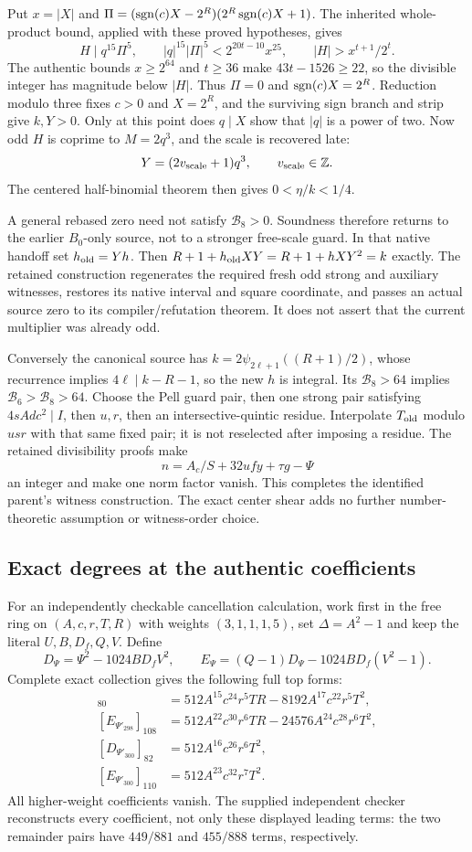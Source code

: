 Put $x=|X|$ and
$\Pi=(\operatorname{sgn}(c)X-2^R)(2^R\operatorname{sgn}(c)X+1)$.
The inherited whole-product bound, applied with these proved hypotheses,
gives
\[
 H\mid q^{15}\Pi^5,\qquad
 |q|^{15}|\Pi|^5<2^{20t-10}x^{25},
 \qquad |H|>x^{t+1}/2^t.
\]
The authentic bounds $x\ge2^{64}$ and $t\ge36$ make
$43t-1526\ge22$, so the divisible integer has magnitude below $|H|$.
Thus $\Pi=0$ and $\operatorname{sgn}(c)X=2^R$. Reduction modulo three fixes
$c>0$ and $X=2^R$, and the surviving sign branch and strip give $k,Y>0$.
Only at this point does $q\mid X$ show that $|q|$ is a power of two.
Now odd $H$ is coprime to $M=2q^3$, and the scale is recovered late:
\[
 Y=(2v_{\rm scale}+1)q^3,\qquad v_{\rm scale}\in\mathbb Z.
\]
The centered half-binomial theorem then gives $0<\eta/k<1/4$.

A general rebased zero need not satisfy $\mathcal B_8>0$.
Soundness therefore returns to the earlier $B_0$-only source, not to a
stronger free-scale guard. In that native handoff set
$h_{\rm old}=Yh$. Then
$R+1+h_{\rm old}XY=R+1+hXY^2=k$ exactly.
The retained construction regenerates the required fresh odd strong and
auxiliary witnesses, restores its native interval and square coordinate,
and passes an actual source zero to its compiler/refutation theorem.
It does not assert that the current multiplier was already odd.

Conversely the canonical source has
$k=2\psi_{2\ell+1}((R+1)/2)$, whose recurrence implies
$4\ell\mid k-R-1$, so the new $h$ is integral.
Its $\mathcal B_8>64$ implies $\mathcal B_6>\mathcal B_8>64$.
Choose the Pell guard pair, then one strong pair satisfying
$4sAdc^2\mid I$, then $u,r$, then an intersective-quintic residue.
Interpolate $T_{\rm old}$ modulo $usr$ with that same fixed pair;
it is not reselected after imposing a residue. The retained divisibility
proofs make
\[
 n=A_c/S+32ufy+\tau g-\Psi
\]
an integer and make one norm factor vanish. This completes the identified
parent's witness construction. The exact center shear adds no further
number-theoretic assumption or witness-order choice.

\subsection{Exact degrees at the authentic coefficients}
For an independently checkable cancellation calculation, work first in the
free ring on $(A,c,r,T,R)$ with weights $(3,1,1,1,5)$, set
$\Delta=A^2-1$ and keep the literal $U,B,D_f,Q,V$. Define
\[
 D_\Psi=\Psi^2-1024BD_fV^2,
 \qquad E_\Psi=(Q-1)D_\Psi-1024BD_f(V^2-1).
\]
Complete exact collection gives the following full top forms:
\begin{align*}
 [D_{\Psi'_{298}}]_{80}
   &=512A^{15}c^{24}r^5TR-8192A^{17}c^{22}r^5T^2,\\
 [E_{\Psi'_{298}}]_{108}
   &=512A^{22}c^{30}r^6TR-24576A^{24}c^{28}r^6T^2,\\
 [D_{\Psi'_{300}}]_{82}&=512A^{16}c^{26}r^6T^2,\\
 [E_{\Psi'_{300}}]_{110}&=512A^{23}c^{32}r^7T^2.
\end{align*}
All higher-weight coefficients vanish. The supplied independent checker
reconstructs every coefficient, not only these displayed leading terms:
the two remainder pairs have $449/881$ and $455/888$ terms, respectively.

